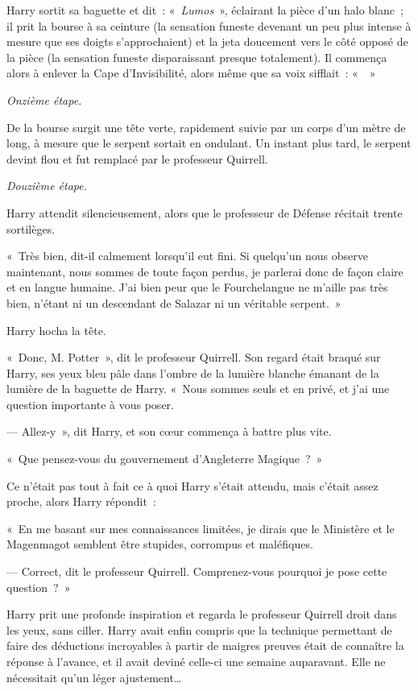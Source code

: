 Harry sortit sa baguette et dit~: «~\emph{Lumos}~», éclairant la pièce d'un halo blanc~; il prit la bourse à sa ceinture (la sensation funeste devenant un peu plus intense à mesure que ses doigts s'approchaient) et la jeta doucement vers le côté opposé de la pièce (la sensation funeste disparaissant presque totalement). Il commença alors à enlever la Cape d'Invisibilité, alors même que sa voix sifflait~: «~~»

\emph{Onzième étape.}

De la bourse surgit une tête verte, rapidement suivie par un corps d'un mètre de long, à mesure que le serpent sortait en ondulant. Un instant plus tard, le serpent devint flou et fut remplacé par le professeur Quirrell.

\emph{Douzième étape.}

Harry attendit silencieusement, alors que le professeur de Défense récitait trente sortilèges.

«~Très bien, dit-il calmement lorsqu'il eut fini. Si quelqu'un nous observe maintenant, nous sommes de toute façon perdus, je parlerai donc de façon claire et en langue humaine. J'ai bien peur que le Fourchelangue ne m'aille pas très bien, n'étant ni un descendant de Salazar ni un véritable serpent.~»

Harry hocha la tête.

«~Donc, M. Potter~», dit le professeur Quirrell. Son regard était braqué sur Harry, ses yeux bleu pâle dans l'ombre de la lumière blanche émanant de la lumière de la baguette de Harry. «~Nous sommes seuls et en privé, et j'ai une question importante à vous poser.

--- Allez-y~», dit Harry, et son cœur commença à battre plus vite.

«~Que pensez-vous du gouvernement d'Angleterre Magique~?~»

Ce n'était pas tout à fait ce à quoi Harry s'était attendu, mais c'était assez proche, alors Harry répondit~:

«~En me basant sur mes connaissances limitées, je dirais que le Ministère et le Magenmagot semblent être stupides, corrompus et maléfiques.

--- Correct, dit le professeur Quirrell. Comprenez-vous pourquoi je pose cette question~?~»

Harry prit une profonde inspiration et regarda le professeur Quirrell droit dans les yeux, sans ciller. Harry avait enfin compris que la technique permettant de faire des déductions incroyables à partir de maigres preuves était de connaître la réponse à l'avance, et il avait deviné celle-ci une semaine auparavant. Elle ne nécessitait qu'un léger ajustement…

